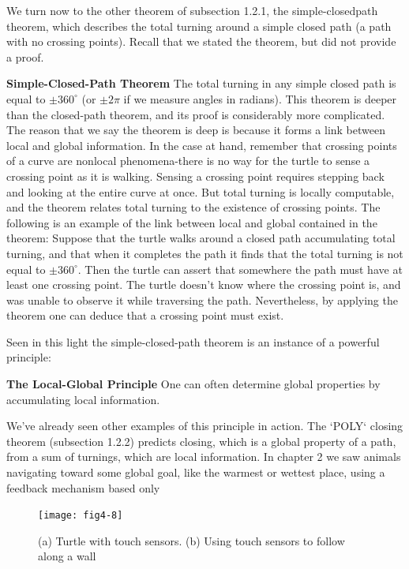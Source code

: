 \documentclass{book}
\begin{document}
We turn now to the other theorem of subsection 1.2.1, the simple-closedpath theorem, which describes the total turning around a simple closed
path (a path with no crossing points). Recall that we stated the theorem,
but did not provide a proof.

\textbf{Simple-Closed-Path Theorem} The total turning in any simple closed
path is equal to $\pm 360^{\circ}$ (or $\pm 2\pi$ if we measure angles in radians).
This theorem is deeper than the closed-path theorem, and its proof is
considerably more complicated. The reason that we say the theorem is
deep is because it forms a link between local and global information. In
the case at hand, remember that crossing points of a curve are nonlocal
phenomena-there is no way for the turtle to sense a crossing point as it
is walking. Sensing a crossing point requires stepping back and looking
at the entire curve at once. But total turning is locally computable, and
the theorem relates total turning to the existence of crossing points.
The following is an example of the link between local and global
contained in the theorem: Suppose that the turtle walks around a closed
path accumulating total turning, and that when it completes the path it
finds that the total turning is not equal to $\pm 360^{\circ}$. Then the turtle can
assert that somewhere the path must have at least one crossing point.
The turtle doesn't know where the crossing point is, and was unable
to observe it while traversing the path. Nevertheless, by applying the
theorem one can deduce that a crossing point must exist.

Seen in this light the simple-closed-path theorem is an instance of a
powerful principle:

\textbf{The Local-Global Principle} One can often determine global properties
by accumulating local information.

We've already seen other examples of this principle in action. The \textsc{`POLY`}
closing theorem (subsection 1.2.2) predicts closing, which is a global
property of a path, from a sum of turnings, which are local information.
In chapter 2 we saw animals navigating toward some global goal, like
the warmest or wettest place, using a feedback mechanism based only

\begin{figure}
\begin{center}
\texttt{[image: fig4-8]}
\caption{(a) Turtle with touch sensors. (b) Using touch sensors to follow along a wall}
\end{center}
\end{figure}
\end{document}
